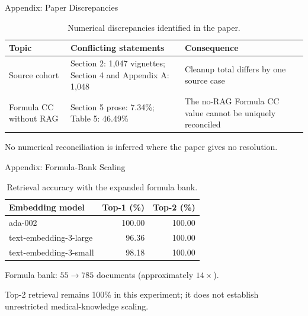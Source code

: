\begin{frame}{Appendix: Paper Discrepancies}
  \small
  \begin{table}
    \caption{Numerical discrepancies identified in the paper.}
    \label{tab:app-paper-discrepancies}
    \begin{tabular}{@{}>{\raggedright\arraybackslash}p{}>{\raggedright\arraybackslash}p{}>{\raggedright\arraybackslash}p{}@{}}
      \toprule
      Topic & Conflicting statements & Consequence \\
      \midrule
      Source cohort & Section 2: 1,047 vignettes; Section 4 and Appendix A: 1,048 & Cleanup total differs by one source case \\
      Formula CC without RAG & Section 5 prose: 7.34\%; Table 5: 46.49\% & The no-RAG Formula CC value cannot be uniquely reconciled \\
      \bottomrule
    \end{tabular}
  \end{table}
  \vspace{0.24cm}
  No numerical reconciliation is inferred where the paper gives no resolution.
\end{frame}

\begin{frame}{Appendix: Formula-Bank Scaling}
  \centering
  \begin{table}
    \caption{Retrieval accuracy with the expanded formula bank.}
    \label{tab:app-formula-scaling}
    \begin{tabular}{lrr}
      \toprule
      Embedding model & Top-1 (\%) & Top-2 (\%) \\
      \midrule
      ada-002 & 100.00 & 100.00 \\
      text-embedding-3-large & 96.36 & 100.00 \\
      text-embedding-3-small & 98.18 & 100.00 \\
      \bottomrule
    \end{tabular}
  \end{table}
  \vspace{0.20cm}
  \small Formula bank: $55\rightarrow785$ documents (approximately $14\times$).\par\vspace{0.10cm}
  {\small Top-2 retrieval remains 100\% in this experiment; it does not establish unrestricted medical-knowledge scaling.}
\end{frame}

